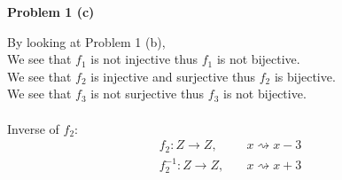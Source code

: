 \documentclass{article}
\begin{document}
\begin{flushleft}
   \textbf{\Large Problem 1 (c)}
\end{flushleft}

By looking at Problem 1 (b), \\
We see that \(f_1\) is not injective thus \(f_1\) is not bijective. \\
We see that \(f_2\) is injective and surjective thus \(f_2\) is bijective. \\
We see that \(f_3\) is not surjective thus \(f_3\) is not bijective. \\
\\
Inverse of \(f_2\):
\begin{align*}
   f_2: Z \rightarrow Z,& \quad x \rightsquigarrow x - 3 \\
   f_2^{-1}: Z \rightarrow Z,& \quad x \rightsquigarrow x + 3 \\
\end{align*}
\\
\end{document}
